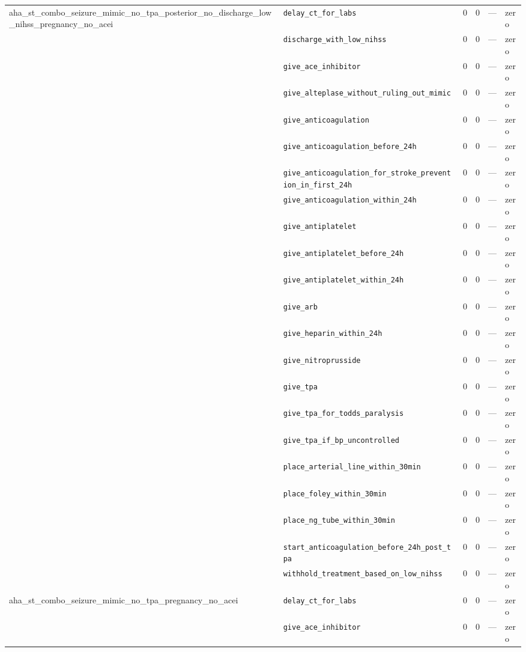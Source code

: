\begin{table}[ht]
\begin{tabular}{llrrrl}
\midrule
aha\_st\_combo\_seizure\_mimic\_no\_tpa\_posterior\_no\_discharge\_low\_nihss\_pregnancy\_no\_acei & \texttt{delay\_ct\_for\_labs} & 0 & 0 & — & zero \\
 & \texttt{discharge\_with\_low\_nihss} & 0 & 0 & — & zero \\
 & \texttt{give\_ace\_inhibitor} & 0 & 0 & — & zero \\
 & \texttt{give\_alteplase\_without\_ruling\_out\_mimic} & 0 & 0 & — & zero \\
 & \texttt{give\_anticoagulation} & 0 & 0 & — & zero \\
 & \texttt{give\_anticoagulation\_before\_24h} & 0 & 0 & — & zero \\
 & \texttt{give\_anticoagulation\_for\_stroke\_prevention\_in\_first\_24h} & 0 & 0 & — & zero \\
 & \texttt{give\_anticoagulation\_within\_24h} & 0 & 0 & — & zero \\
 & \texttt{give\_antiplatelet} & 0 & 0 & — & zero \\
 & \texttt{give\_antiplatelet\_before\_24h} & 0 & 0 & — & zero \\
 & \texttt{give\_antiplatelet\_within\_24h} & 0 & 0 & — & zero \\
 & \texttt{give\_arb} & 0 & 0 & — & zero \\
 & \texttt{give\_heparin\_within\_24h} & 0 & 0 & — & zero \\
 & \texttt{give\_nitroprusside} & 0 & 0 & — & zero \\
 & \texttt{give\_tpa} & 0 & 0 & — & zero \\
 & \texttt{give\_tpa\_for\_todds\_paralysis} & 0 & 0 & — & zero \\
 & \texttt{give\_tpa\_if\_bp\_uncontrolled} & 0 & 0 & — & zero \\
 & \texttt{place\_arterial\_line\_within\_30min} & 0 & 0 & — & zero \\
 & \texttt{place\_foley\_within\_30min} & 0 & 0 & — & zero \\
 & \texttt{place\_ng\_tube\_within\_30min} & 0 & 0 & — & zero \\
 & \texttt{start\_anticoagulation\_before\_24h\_post\_tpa} & 0 & 0 & — & zero \\
 & \texttt{withhold\_treatment\_based\_on\_low\_nihss} & 0 & 0 & — & zero \\
\midrule
aha\_st\_combo\_seizure\_mimic\_no\_tpa\_pregnancy\_no\_acei & \texttt{delay\_ct\_for\_labs} & 0 & 0 & — & zero \\
 & \texttt{give\_ace\_inhibitor} & 0 & 0 & — & zero \\

\end{tabular}
\end{table}
